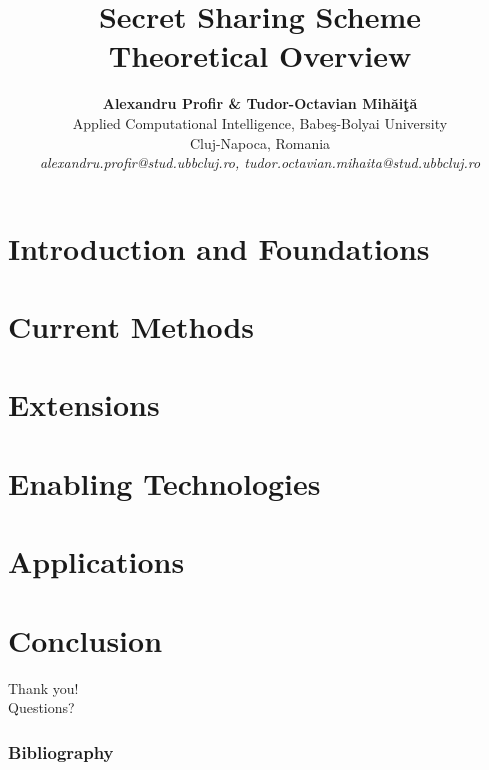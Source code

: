 \documentclass[11pt]{beamer}
\title[SSS - Theoretical Overview]{Secret Sharing Scheme \\ Theoretical Overview}
\author[Alexandru Profir \& Tudor-Octavian Mih\u{a}i\c{t}\u{a}]{
	\textbf{Alexandru Profir \& Tudor-Octavian Mih\u{a}i\c{t}\u{a}} \\
	Applied Computational Intelligence, Babe\c{s}-Bolyai University \\
	Cluj-Napoca, Romania \\
	\textit{alexandru.profir@stud.ubbcluj.ro, tudor.octavian.mihaita@stud.ubbcluj.ro}
}
\begin{document}


\section{Introduction and Foundations}



\section{Current Methods}



\section{Extensions}



\section{Enabling Technologies}


\section{Applications}


\section{Conclusion}



\begin{frame}
    \begin{center}
    	\begin{center}
            {\Huge{Thank you!}}\\
            \vspace{1cm}
            {\Huge{Questions?}}\\
    	\end{center}
	\end{center}
\end{frame} 

\begin{frame}[allowframebreaks]
	\frametitle{Bibliography}
	\scriptsize
	
	
\end{frame}
\end{document}
